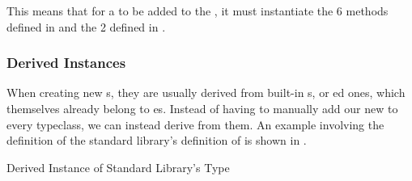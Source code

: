 This means that for a  to be added to the  , it must instantiate the 6 methods defined in  and the 2 defined in .

\subsubsection{Derived Instances}\label{subsubsec:Derived_Instances}
When creating new s, they are usually derived from built-in s, or ed ones, which themselves already belong to es.
Instead of having to manually add our new   to every typeclass, we can instead derive from them.
An example involving the definition of the standard library's definition of  is shown in .

\begin{listing}[h!tbp]
\caption{Derived Instance of Standard Library's  Type}
\label{lst:Bool_Derived_Instance}
\end{listing}


